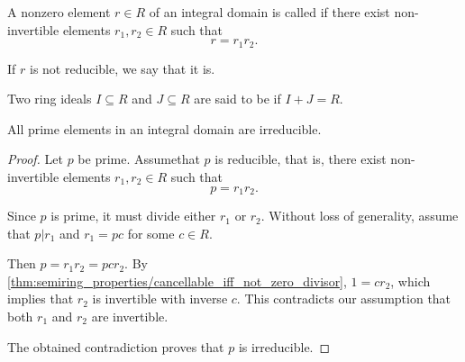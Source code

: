 \begin{definition}\label{def:irreducible_ring_ideal}
  A nonzero element \( r \in R \) of an integral domain is called  if there exist non-invertible elements \( r_1, r_2 \in R \) such that
  \begin{equation*}
    r = r_1 r_2.
  \end{equation*}

  If \( r \) is not reducible, we say that it is.
\end{definition}

\begin{definition}\label{def:coprime_ring_ideals}
  Two ring ideals \( I \subseteq R \) and \( J \subseteq R \) are said to be  if \( I + J = R \).
\end{definition}

\begin{proposition}\label{thm:prime_implies_irreducible}\cite[389]{Knapp2016BAlg}
  All prime elements in an integral domain are irreducible.
\end{proposition}
\begin{proof}
  Let \( p \) be prime. Assume\LEM that \( p \) is reducible, that is, there exist non-invertible elements \( r_1, r_2 \in R \) such that
  \begin{equation*}
    p = r_1 r_2.
  \end{equation*}

  Since \( p \) is prime, it must divide either \( r_1 \) or \( r_2 \). Without loss of generality, assume that \( p | r_1 \) and \( r_1 = pc \) for some \( c \in R \).

  Then \( p = r_1 r_2 = pc r_2 \). By \cref{thm:semiring_properties/cancellable_iff_not_zero_divisor}, \( 1 = c r_2 \), which implies that \( r_2 \) is invertible with inverse \( c \). This contradicts our assumption that both \( r_1 \) and \( r_2 \) are invertible.

  The obtained contradiction proves that \( p \) is irreducible.
\end{proof}

